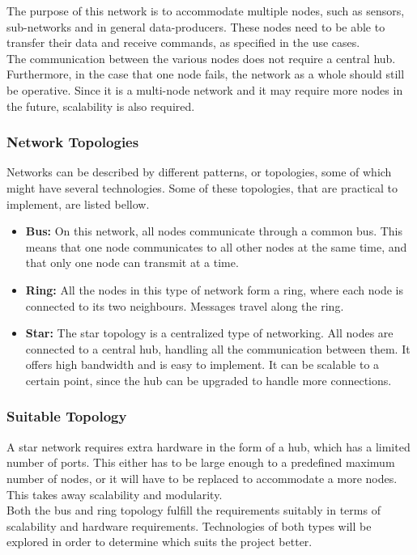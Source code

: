 The purpose of this network is to accommodate multiple nodes, such as sensors, sub-networks and in general data-producers.
These nodes need to be able to transfer their data and receive commands, as specified in the use cases.
\\
The communication between the various nodes does not require a central hub.
Furthermore, in the case that one node fails, the network as a whole should still be operative.
Since it is a multi-node network and it may require more nodes in the future, scalability is also required.

\subsubsection*{Network Topologies}
Networks can be described by different patterns, or topologies, some of which might have several technologies.
Some of these topologies, that are practical to implement, are listed bellow.
\begin{itemize}
\item \textbf{Bus:}
On this network, all nodes communicate through a common bus. 
This means that one node communicates to all other nodes at the same time, and that only one node can transmit at a time.
\item \textbf{Ring:} All the nodes in this type of network form a ring, where each node is connected to its two neighbours.
Messages travel along the ring.
\item \textbf{Star:} The star topology is a centralized type of networking.
All nodes are connected to a central hub, handling all the communication between them.
It offers high bandwidth and is easy to implement.
It can be scalable to a certain point, since the hub can be upgraded to handle more connections.
\end{itemize}

\subsubsection*{Suitable Topology}

A star network requires extra hardware in the form of a hub, which has a limited number of ports. 
This either has to be large enough to a predefined maximum number of nodes, or it will have to be replaced to accommodate a more nodes.
This takes away scalability and modularity.\\

Both the bus and ring topology fulfill the requirements suitably in terms of scalability and hardware requirements.
Technologies of both types will be explored in order to determine which suits the project better.


